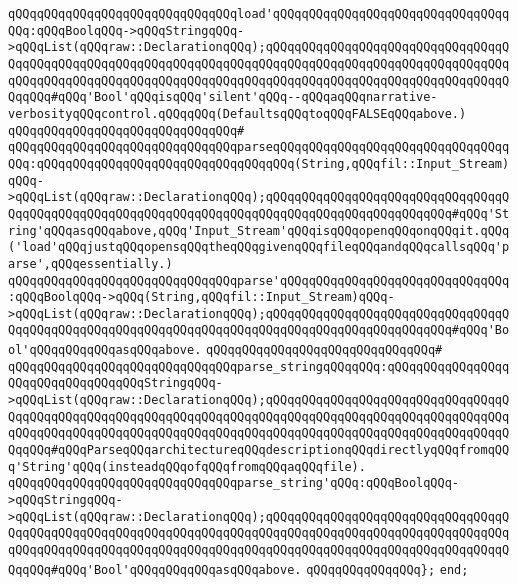 \verb|qQQqqQQqqQQqqQQqqQQqqQQqqQQqqQQqload'qQQqqQQqqQQqqQQqqQQqqQQqqQQqqQQqqQQq:qQQqBoolqQQq->qQQqStringqQQq->qQQqList(qQQqraw::DeclarationqQQq);qQQqqQQqqQQqqQQqqQQqqQQqqQQqqQQqqQQqqQQqqQQqqQQqqQQqqQQqqQQqqQQqqQQqqQQqqQQqqQQqqQQqqQQqqQQqqQQqqQQqqQQqqQQqqQQqqQQqqQQqqQQqqQQqqQQqqQQqqQQqqQQqqQQqqQQqqQQqqQQqqQQqqQQqqQQqqQQqqQQq#qQQq'Bool'qQQqisqQQq'silent'qQQq--qQQqaqQQqnarrative-verbosityqQQqcontrol.qQQqqQQq(DefaultsqQQqtoqQQqFALSEqQQqabove.)|\newline
\verb|qQQqqQQqqQQqqQQqqQQqqQQqqQQqqQQq#|\newline
\verb|qQQqqQQqqQQqqQQqqQQqqQQqqQQqqQQqparseqQQqqQQqqQQqqQQqqQQqqQQqqQQqqQQqqQQq:qQQqqQQqqQQqqQQqqQQqqQQqqQQqqQQqqQQq(String,qQQqfil::Input_Stream)qQQq->qQQqList(qQQqraw::DeclarationqQQq);qQQqqQQqqQQqqQQqqQQqqQQqqQQqqQQqqQQqqQQqqQQqqQQqqQQqqQQqqQQqqQQqqQQqqQQqqQQqqQQqqQQqqQQqqQQqqQQq#qQQq'String'qQQqasqQQqabove,qQQq'Input_Stream'qQQqisqQQqopenqQQqonqQQqit.qQQq('load'qQQqjustqQQqopensqQQqtheqQQqgivenqQQqfileqQQqandqQQqcallsqQQq'parse',qQQqessentially.)|\newline
\verb|qQQqqQQqqQQqqQQqqQQqqQQqqQQqqQQqparse'qQQqqQQqqQQqqQQqqQQqqQQqqQQqqQQq:qQQqBoolqQQq->qQQq(String,qQQqfil::Input_Stream)qQQq->qQQqList(qQQqraw::DeclarationqQQq);qQQqqQQqqQQqqQQqqQQqqQQqqQQqqQQqqQQqqQQqqQQqqQQqqQQqqQQqqQQqqQQqqQQqqQQqqQQqqQQqqQQqqQQqqQQqqQQq#qQQq'Bool'qQQqqQQqqQQqasqQQqabove.|\newline
\verb|qQQqqQQqqQQqqQQqqQQqqQQqqQQqqQQq#|\newline
\verb|qQQqqQQqqQQqqQQqqQQqqQQqqQQqqQQqparse_stringqQQqqQQq:qQQqqQQqqQQqqQQqqQQqqQQqqQQqqQQqqQQqStringqQQq->qQQqList(qQQqraw::DeclarationqQQq);qQQqqQQqqQQqqQQqqQQqqQQqqQQqqQQqqQQqqQQqqQQqqQQqqQQqqQQqqQQqqQQqqQQqqQQqqQQqqQQqqQQqqQQqqQQqqQQqqQQqqQQqqQQqqQQqqQQqqQQqqQQqqQQqqQQqqQQqqQQqqQQqqQQqqQQqqQQqqQQqqQQqqQQqqQQqqQQqqQQq#qQQqParseqQQqarchitectureqQQqdescriptionqQQqdirectlyqQQqfromqQQq'String'qQQq(insteadqQQqofqQQqfromqQQqaqQQqfile).|\newline
\verb|qQQqqQQqqQQqqQQqqQQqqQQqqQQqqQQqparse_string'qQQq:qQQqBoolqQQq->qQQqStringqQQq->qQQqList(qQQqraw::DeclarationqQQq);qQQqqQQqqQQqqQQqqQQqqQQqqQQqqQQqqQQqqQQqqQQqqQQqqQQqqQQqqQQqqQQqqQQqqQQqqQQqqQQqqQQqqQQqqQQqqQQqqQQqqQQqqQQqqQQqqQQqqQQqqQQqqQQqqQQqqQQqqQQqqQQqqQQqqQQqqQQqqQQqqQQqqQQqqQQqqQQqqQQq#qQQq'Bool'qQQqqQQqqQQqasqQQqabove.|\newline
\verb|qQQqqQQqqQQqqQQq};|\newline
\verb|end;|\newline

